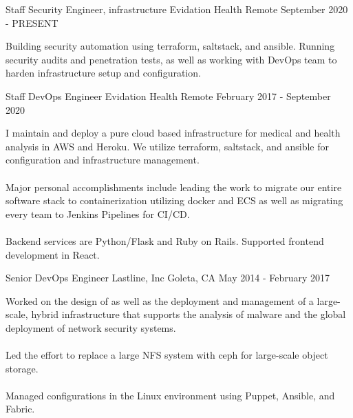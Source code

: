 
\begin{cventries}
  
  \cventry
  {Staff Security Engineer, infrastructure} %
  {Evidation Health} %
  {Remote} %
  {September 2020 - PRESENT} %
  {
    \begin{cvitems} %
        {Building security automation using terraform, saltstack, and ansible. Running security audits and penetration tests, as well as working with DevOps team to harden infrastructure setup and configuration.  }
    \end{cvitems}
  }

  \cventry
    {Staff DevOps Engineer} %
    {Evidation Health} %
    {Remote} %
    {February 2017 - September 2020} %
    {
      \begin{cvitems} %
          {I maintain and deploy a pure cloud based infrastructure for medical and health analysis in AWS and Heroku. We utilize terraform, saltstack, and ansible for configuration and infrastructure management. \\~\\ Major personal accomplishments include leading the work to migrate our entire software stack to containerization utilizing docker and ECS as well as migrating every team to Jenkins Pipelines for CI/CD. \\~\\ Backend services are Python/Flask and Ruby on Rails. Supported frontend development in React.}
      \end{cvitems}
    }

  \cventry
    {Senior DevOps Engineer} %
    {Lastline, Inc} %
    {Goleta, CA} %
    {May 2014 - February 2017} %
    {
      \begin{cvitems} %
        { Worked on the design of as well as the deployment and management of a large-scale, hybrid infrastructure that supports the analysis of malware and the global deployment of network security systems. \\~\\ Led the effort to replace a large NFS system with ceph for large-scale object storage. \\~\\ Managed configurations in the Linux environment using Puppet, Ansible, and Fabric. }
      \end{cvitems}
    }


\end{cventries}
